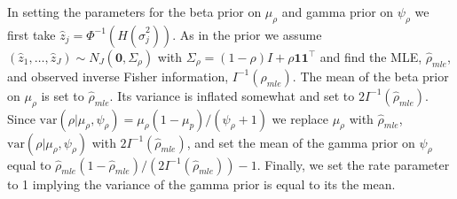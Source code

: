 \documentclass[ba]{imsart}
\newcommand{\mb}{\mathbf}
\begin{document}
In setting the parameters for the beta prior on $\mu_{\rho}$ and gamma prior on  $\psi_\rho$ we first take $\hat z_{j}= \Phi^{-1} (H(\hat\sigma_{j}^{2}))$. As in the prior we assume $(\hat z_1,\dots,\hat z_J)\sim N_J(\mathbf{0}, \Sigma_\rho)$ with
$\Sigma_\rho=(1-\rho)I+\rho \mb{1}\mb{1}^{\top}$ and find the MLE, $\hat\rho_{mle}$, and observed inverse Fisher information, $I^{-1}(\rho_{mle})$. The mean of the beta prior on $\mu_{\rho}$ is set to $\hat\rho_{mle}$. Its variance is inflated somewhat and set to $2I^{-1}(\hat\rho_{mle})$. Since $\text{var}(\rho|\mu_{\rho}, \psi_{\rho})=\mu_{\rho} (1-\mu_{p})/(\psi_{\rho}+1)$ we replace $\mu_{\rho}$ with $\hat\rho_{mle}$, $\text{var}(\rho|\mu_{\rho}, \psi_{\rho})$ with $2I^{-1}(\hat\rho_{mle})$, and set the mean of the gamma prior on $\psi_{\rho}$ equal to $\hat\rho_{mle} (1-\hat\rho_{mle})/(2I^{-1}(\hat\rho_{mle}))-1$. Finally, we  set the rate parameter to 1 implying the variance of the gamma prior is equal to its the mean.

%




\end{document}
